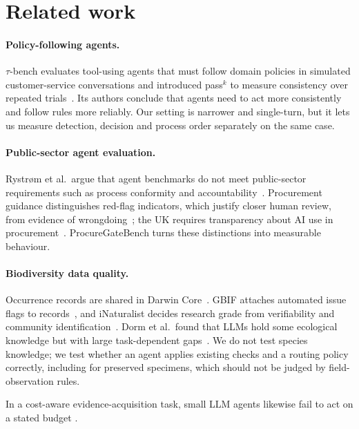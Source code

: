 \documentclass[11pt,a4paper]{article}
\begin{document}
\section{Related work}

\paragraph{Policy-following agents.} $\tau$-bench evaluates tool-using agents that must follow domain policies in
simulated customer-service conversations and introduced pass$^k$ to measure consistency over repeated
trials~\cite{yao2024tau}. Its authors conclude that agents need to act more consistently and follow rules more
reliably. Our setting is narrower and single-turn, but it lets us measure detection, decision and process order
separately on the same case.

\paragraph{Public-sector agent evaluation.} Rystrøm et al.\ argue that agent benchmarks do not meet public-sector
requirements such as process conformity and accountability~\cite{rystrom2026public}. Procurement guidance
distinguishes red-flag indicators, which justify closer human review, from evidence of
wrongdoing~\cite{oecd2025bidrigging,oecd2026integrity}; the UK requires transparency about AI use in
procurement~\cite{ppn0172025}. ProcureGateBench turns these distinctions into measurable behaviour.

\paragraph{Biodiversity data quality.} Occurrence records are shared in Darwin Core~\cite{wieczorek2012darwin}.
GBIF attaches automated issue flags to records~\cite{gbif2026issues}, and iNaturalist decides research grade from
verifiability and community identification~\cite{inat2026dqa,campbell2023identifiers}. Dorm et al.\ found that
LLMs hold some ecological knowledge but with large task-dependent gaps~\cite{dorm2026ecological}. We do not test
species knowledge; we test whether an agent applies existing checks and a routing policy correctly, including
for preserved specimens, which should not be judged by field-observation rules.

In a cost-aware evidence-acquisition task, small LLM agents likewise fail to act on a stated budget \cite{hussain2026exovet}.
\end{document}
